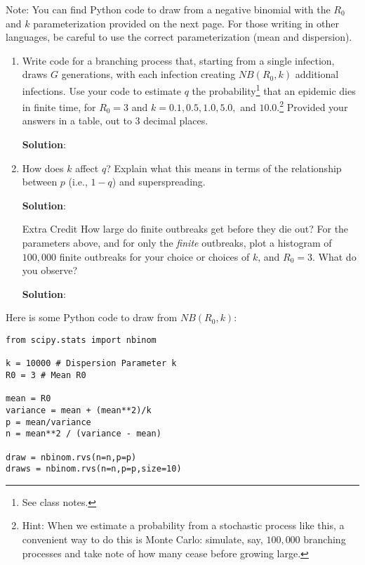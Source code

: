 \documentclass[11pt]{article}
\begin{document}
\begin{enumerate}
Note: You can find Python code to draw from a negative binomial with the $R_0$ and $k$ parameterization provided on the next page. For those writing in other languages, be careful to use the correct parameterization (mean and dispersion).

\begin{enumerate}[label=\alph*.]
	\item Write code for a branching process that, starting from a single infection, draws $G$ generations, with each infection creating $NB(R_0,k)$ additional infections. Use your code to estimate $q$ the probability\footnote{See class notes.} that an epidemic dies in finite time, for $R_0=3$ and $k=0.1, 0.5, 1.0, 5.0,$ and $10.0$.\footnote{Hint: When we estimate a probability from a stochastic process like this, a convenient way to do this is Monte Carlo: simulate, say, $100,000$ branching processes and take note of how many cease before growing large.} Provided your answers in a table, out to 3 decimal places.
	
	\begin{tcolorbox}[breakable]
		\textbf{Solution}:\\
		
	\end{tcolorbox}
	
	\item How does $k$ affect $q$? Explain what this means in terms of the relationship between $p$ (i.e., $1-q$) and superspreading. 
	
	\begin{tcolorbox}[breakable]
		\textbf{Solution}:\\
		
	\end{tcolorbox}
	
	\item [Extra Credit] How large do finite outbreaks get before they die out? For the parameters above, and for only the {\it finite} outbreaks, plot a histogram of $100,000$ finite outbreaks for your choice or choices of $k$, and $R_0=3$. What do you observe? 
	
	\begin{tcolorbox}[breakable]
		\textbf{Solution}:\\
		
	\end{tcolorbox}
	
\end{enumerate}

\clearpage
Here is some Python code to draw from $NB(R_0, k)$:
\begin{verbatim}
from scipy.stats import nbinom

k = 10000 # Dispersion Parameter k
R0 = 3 # Mean R0

mean = R0
variance = mean + (mean**2)/k
p = mean/variance
n = mean**2 / (variance - mean) 

draw = nbinom.rvs(n=n,p=p)
draws = nbinom.rvs(n=n,p=p,size=10)
\end{verbatim}



\end{enumerate}
\end{document}
